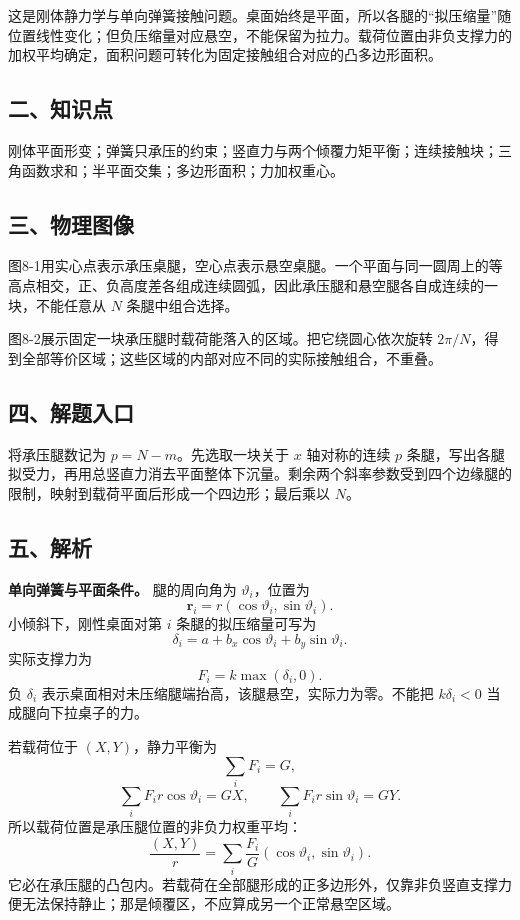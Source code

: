 \documentclass[12pt,a4paper,UTF8]{ctexart}
\begin{document}
这是刚体静力学与单向弹簧接触问题。桌面始终是平面，所以各腿的``拟压缩量''随位置线性变化；但负压缩量对应悬空，不能保留为拉力。载荷位置由非负支撑力的加权平均确定，面积问题可转化为固定接触组合对应的凸多边形面积。

\subsection{二、知识点}\label{ux4e8cux77e5ux8bc6ux70b9-7}

刚体平面形变；弹簧只承压的约束；竖直力与两个倾覆力矩平衡；连续接触块；三角函数求和；半平面交集；多边形面积；力加权重心。

\subsection{三、物理图像}\label{ux4e09ux7269ux7406ux56feux50cf-7}

图8-1用实心点表示承压桌腿，空心点表示悬空桌腿。一个平面与同一圆周上的等高点相交，正、负高度差各组成连续圆弧，因此承压腿和悬空腿各自成连续的一块，不能任意从
\(N\) 条腿中组合选择。

图8-2展示固定一块承压腿时载荷能落入的区域。把它绕圆心依次旋转
\(2\pi/N\)，得到全部等价区域；这些区域的内部对应不同的实际接触组合，不重叠。

\subsection{四、解题入口}\label{ux56dbux89e3ux9898ux5165ux53e3-7}

将承压腿数记为 \(p=N-m\)。先选取一块关于 \(x\) 轴对称的连续 \(p\)
条腿，写出各腿拟受力，再用总竖直力消去平面整体下沉量。剩余两个斜率参数受到四个边缘腿的限制，映射到载荷平面后形成一个四边形；最后乘以
\(N\)。

\subsection{五、解析}\label{ux4e94ux89e3ux6790-7}

\textbf{单向弹簧与平面条件。} 腿的周向角为 \(\vartheta_i\)，位置为 \[
\boldsymbol r_i=r(\cos\vartheta_i,\sin\vartheta_i).
\] 小倾斜下，刚性桌面对第 \(i\) 条腿的拟压缩量可写为 \[
\delta_i=a+b_x\cos\vartheta_i+b_y\sin\vartheta_i.
\] 实际支撑力为 \[
\boxed{F_i=k\max(\delta_i,0)}.
\] 负 \(\delta_i\)
表示桌面相对未压缩腿端抬高，该腿悬空，实际力为零。不能把 \(k\delta_i<0\)
当成腿向下拉桌子的力。

若载荷位于 \((X,Y)\)，静力平衡为 \[
\sum_iF_i=G,
\] \[
\sum_iF_i r\cos\vartheta_i=GX,
\qquad
\sum_iF_i r\sin\vartheta_i=GY.
\] 所以载荷位置是承压腿位置的非负力权重平均： \[
\boxed{\frac{(X,Y)}r=
\sum_i\frac{F_i}{G}(\cos\vartheta_i,\sin\vartheta_i)}.
\]
它必在承压腿的凸包内。若载荷在全部腿形成的正多边形外，仅靠非负竖直支撑力便无法保持静止；那是倾覆区，不应算成另一个正常悬空区域。
\end{document}
